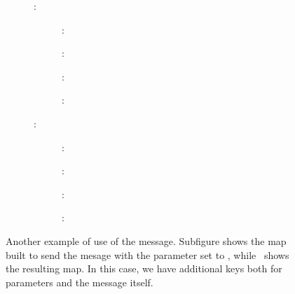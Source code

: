 \begin{figure}[tbp]
{\begin{minipage}{0.67\columnwidth}
\begin{small}
\begin{description}
\begin{description}
\begin{description}
								\item[]:
								\begin{description}
									\item[]:
									\item[]:
									\item[]:
									\item[]:
								\end{description}
								
								\item[]:
								\begin{description}
									\item[]:
									\item[]:
									\item[]:
									\item[]:
								\end{description}
							\end{description} 
						\end{description}
					\end{description}
					\end{small}
				\end{minipage}
			} 
			\caption[Verbose description of the
			 method.]
			{
				Another example of use of the
				 message. Subfigure
				 shows
				the map built to send the
				 mesage with the
				 parameter set to ,
				while~
				shows the resulting map. In this case, we
				have additional  keys
				both for parameters and the message itself.
			}
			\label{fig:describeVerboseFITSload}
		\end{figure}
		
